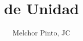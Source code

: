 \documentclass[examen]{RDS_unit}
\title{de Unidad}
\author{Melchor Pinto, JC}
\begin{document}
\begin{questions}

\end{questions}
\end{document}
